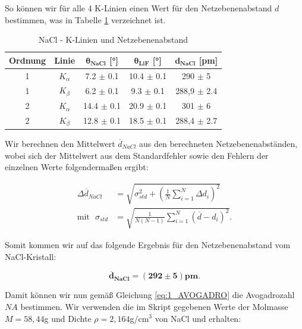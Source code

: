 \documentclass{article}
\begin{document}
So können wir für alle 4 K-Linien einen Wert für den Netzebenenabstand $d$ bestimmen, was in Tabelle \ref{tab:4K_Netz} verzeichnet ist.

\phantom{.}

\begin{table}[!h]
    \centering
    \begin{tabular}{ccccc}
        \hline
        \textbf{Ordnung} & \textbf{Linie} & $\bm{\theta_{NaCl}}$ [°] & $\bm{\theta_{LiF}}$ [°]  & $\bm{d_{NaCl}}$ [pm] \\ \hline
              1 & $K_\alpha$    &     7.2 $\pm$ 0.1 &   10.4 $\pm$ 0.1 & 290 $\pm$ 5 \\
              1 & $K_\beta$     &     6.2 $\pm$ 0.1 &    9.3 $\pm$ 0.1 & 288,9 $\pm$ 2.4 \\
              2 & $K_\alpha$    &    14.4 $\pm$ 0.1 &   20.9 $\pm$ 0.1 & 301 $\pm$ 6 \\
              2 & $K_\beta$     &    12.8 $\pm$ 0.1 &   18.5 $\pm$ 0.1 & 288,4 $\pm$ 2.7 \\ \hline
    \end{tabular}%
    \caption{NaCl - K-Linien und Netzebenenabstand}
    \label{tab:4K_Netz}
\end{table}

\phantom{.}

Wir berechnen den Mittelwert $\overline{d}_{NaCl}$ aus den berechneten Netzebenenabständen, wobei sich der Mittelwert aus dem Standardfehler sowie den Fehlern der einzelnen Werte folgendermaßen ergibt:

\begin{equation}
    \begin{split}
        \Delta \overline{d}_{NaCl} &= \sqrt{\sigma_{std}^2 + \left( \frac{1}{N} \sum_{i=1}^N \Delta d_i \right)^2} \\
        \text{mit} \ \ \ \sigma_{std} &= \sqrt{\frac{1}{N(N-1)} \sum_{i=1}^N (\overline{d} - d_i)^2}.
    \end{split}
\end{equation}

Somit kommen wir auf das folgende Ergebnis für den Netzebenenabstand vom NaCl-Kristall:

\begin{equation}
    \bm{\overline{d}_{NaCl} = (292 \pm 5)} \textbf{pm}.
\end{equation}

Damit können wir nun gemäß Gleichung \ref{eq:1_AVOGADRO} die Avogadrozahl $NA$ bestimmen. Wir verwenden die im Skript gegebenen Werte der Molmasse $M = 58,44$g und Dichte $\rho = 2,164$g/cm$^3$ von NaCl und erhalten:
\end{document}
